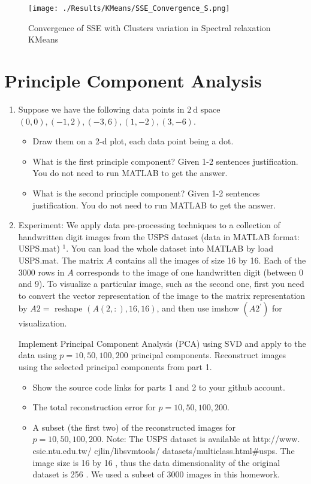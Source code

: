 \documentclass[11pt]{article}
\begin{document}
\begin{figure}[htbp]
	\centering
	\texttt{[image: ./Results/KMeans/SSE\_Convergence\_S.png]}
	\caption{Convergence of SSE with Clusters variation in Spectral relaxation KMeans}
	\label{fig:SSEconvergence}
\end{figure}

\clearpage

\section{Principle Component Analysis}

\begin{enumerate}
	\item  Suppose we have the following data points in $2 \mathrm{~d}$ space $(0,0),(-1,2),(-3,6),(1,-2),(3,-6)$.
	\begin{itemize}
\item Draw them on a 2-d plot, each data point being a dot.
\item  What is the first principle component? Given 1-2 sentences justification. You do not need to run MATLAB to get the answer.
\item  What is the second principle component? Given 1-2 sentences justification. You do not need to run MATLAB to get the answer.
\end{itemize}

\item  Experiment: We apply data pre-processing techniques to a collection of handwritten digit images from the USPS dataset (data in MATLAB format: USPS.mat) ${ }^1$. You can load the whole dataset into MATLAB by load USPS.mat. The matrix $A$ contains all the images of size 16 by 16. Each of the 3000 rows in $A$ corresponds to the image of one handwritten digit (between 0 and 9). To visualize a particular image, such as the second one, first you need to convert the vector representation of the image to the matrix representation by $A 2=$ reshape $(A(2,:), 16,16)$, and then use imshow $\left(A 2^{\prime}\right)$ for visualization.

Implement Principal Component Analysis (PCA) using SVD and apply to the data using $p=10,50,100,200$ principal components. Reconstruct images using the selected principal components from part 1.

\begin{itemize}
\item Show the source code links for parts 1 and 2 to your github account.
\item  The total reconstruction error for $p=10,50,100,200$.
\item  A subset (the first two) of the reconstructed images for $p=10,50,100,200$.
Note: The USPS dataset is available at http://www. csie.ntu.edu.tw/ cjlin/libsvmtools/ datasets/multiclass.html\#usps. The image size is 16 by 16 , thus the data dimensionality of the original dataset is 256 . We used a subset of 3000 images in this homework.
\end{itemize}
\end{enumerate}
\end{document}
